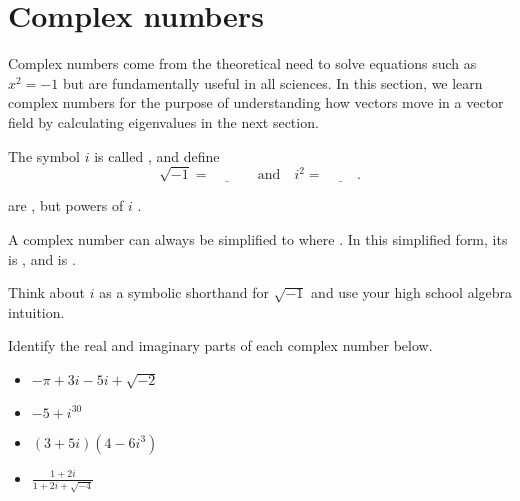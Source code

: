 \documentclass[../main.tex]{subfiles}
\begin{document}
 \section{Complex numbers}

Complex numbers come from the theoretical need to solve equations such as \(x^{2} = -1\) but are fundamentally useful in all sciences.  In this section, we learn complex numbers for the purpose of understanding how vectors move in a vector field by calculating eigenvalues in the next section.

\begin{definition}
  The symbol \(i\) is called , and define
  \[
    \sqrt{-1} = \underline{\hspace{1cm}}
    \quad\text{and}\quad 
    i^{2} = \underline{\hspace{1cm}}.
  \]

   are , but powers of \(i\) .

  A complex number can always be simplified to \underline{\hspace{2cm}} where \underline{\hspace{1.5in}}. In this simplified form, its  is \underline{\hspace{1cm}}, and  is \underline{\hspace{1cm}}.
\end{definition}
\faStar{} Think about \(i\) as a symbolic shorthand for \(\sqrt{-1}\) and use your high school algebra intuition.


\begin{example}
  Identify the real and imaginary parts of each complex number below. 

  \begin{itemize}[wide]
    \item \(-\pi + 3i - 5i + \sqrt{-2}\)

    \item \(-5 + i^{30} \)
      \clearpage

    \item \((3 + 5i) (4 - 6i^{3})\)

    \item \(\frac{1 + 2i}{1 + 2i + \sqrt{-4}}\)
  \end{itemize}
\end{example}
\end{document}
